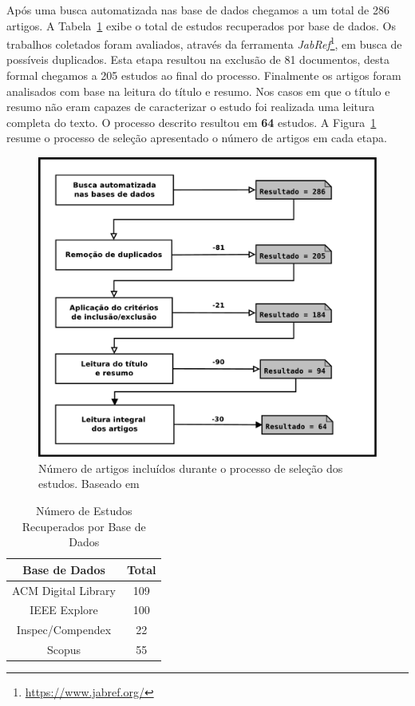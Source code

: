 Após uma busca automatizada nas base de dados chegamos a um total de 286
artigos. A Tabela~\ref{tab:estudos-por-base-dados} exibe o total de estudos
recuperados por base de dados.  Os trabalhos coletados foram avaliados, através
da ferramenta \textit{JabRef}\footnote{\url{https://www.jabref.org/}}, em busca
de possíveis duplicados. Esta etapa resultou na exclusão de 81 documentos, desta
formal chegamos a 205 estudos ao final do processo. Finalmente os artigos foram
analisados com base na leitura do título e resumo. Nos casos em que o título e
resumo não eram capazes de caracterizar o estudo foi realizada uma leitura
completa do texto. O processo descrito resultou em \textbf{64} estudos. A
Figura~\ref{fig:diagrama-processo-selecao} resume o processo de seleção
apresentado o número de artigos em cada etapa.

\begin{figure} \centering \includegraphics[width=0.75\linewidth]
	{./chapter-mapeamento-sistematico/img/diagrama-processo-selecao.pdf}
	\caption{Número de artigos incluídos durante o processo de seleção dos
		estudos. Baseado
		em~\cite{Petersen2015}}\label{fig:diagrama-processo-selecao}
\end{figure}

\begin{table}[htb] \centering \caption{Número de Estudos Recuperados por Base de
		Dados}\label{tab:estudos-por-base-dados} \begin{tabular}{cc} \hline
		\textbf{Base de Dados} & \textbf{Total} \\ \hline ACM Digital Library
		& 109            \\ IEEE Explore           & 100            \\
		Inspec/Compendex       & 22             \\ Scopus                 & 55
		\\ \hline \end{tabular}

\end{table}

